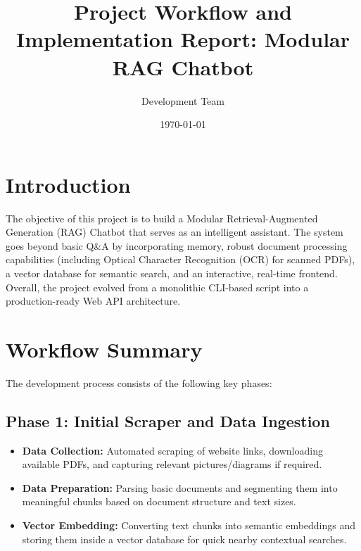 \documentclass{article}
\title{Project Workflow and Implementation Report: Modular RAG Chatbot}
\author{Development Team}
\date{\today}
\begin{document}
\maketitle

\section{Introduction}
The objective of this project is to build a Modular Retrieval-Augmented Generation (RAG) Chatbot that serves as an intelligent assistant. The system goes beyond basic Q\&A by incorporating memory, robust document processing capabilities (including Optical Character Recognition (OCR) for scanned PDFs), a vector database for semantic search, and an interactive, real-time frontend. Overall, the project evolved from a monolithic CLI-based script into a production-ready Web API architecture.

\section{Workflow Summary}

The development process consists of the following key phases:

\subsection{Phase 1: Initial Scraper and Data Ingestion}
\begin{itemize}
    \item \textbf{Data Collection:} Automated scraping of website links, downloading available PDFs, and capturing relevant pictures/diagrams if required.
    \item \textbf{Data Preparation:} Parsing basic documents and segmenting them into meaningful chunks based on document structure and text sizes.
    \item \textbf{Vector Embedding:} Converting text chunks into semantic embeddings and storing them inside a vector database for quick nearby contextual searches.
\end{itemize}
\end{document}

